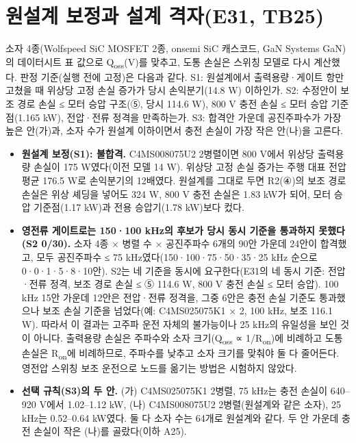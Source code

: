 \section{원설계 보정과 설계 격자(E31, TB25)}

소자 4종(Wolfspeed SiC MOSFET 2종, onsemi SiC 캐스코드, GaN Systems GaN)의 데이터시트 표 값으로 Q\textsubscript{oss}(V)를 맞추고\cite{b34}, 도통 손실은 스위칭 모델로 다시 계산했다. 판정 기준(실행 전에 고정)은 다음과 같다. S1: 원설계에서 출력용량·게이트 항만 고쳤을 때 위상당 고정 손실 증가가 당시 손익분기(14.8 W) 이하인가. S2: 수정안이 보조 경로 손실 ≤ 모터 승압 구조(⑤, 당시 114.6 W), 800 V 충전 손실 ≤ 모터 승압 기준점(1.165 kW), 전압·전류 정격을 만족하는가. S3: 합격안 가운데 공진주파수가 가장 높은 안(가)과, 소자 수가 원설계 이하이면서 충전 손실이 가장 작은 안(나)을 고른다.

\begin{itemize}
\item \textbf{원설계 보정(S1): 불합격.} C4MS008075U2 2병렬이면 800 V에서 위상당 출력용량 손실이 175 W였다(이전 모델 14 W). 위상당 고정 손실 증가는 주행 대표 전압 평균 176.5 W로 손익분기의 12배였다. 원설계를 그대로 두면 R2(④)의 보조 경로 손실은 위상 셰딩을 넣어도 324 W, 800 V 충전 손실은 1.83 kW가 되어, 모터 승압 기준점(1.17 kW)과 전용 승압기(1.78 kW)보다 컸다.
\item \textbf{영전류 게이트로는 150·100 kHz의 후보가 당시 동시 기준을 통과하지 못했다(S2 0/30).} 소자 4종 × 병렬 수 × 공진주파수 6개의 90안 가운데 24안이 합격했고, 모두 공진주파수 ≤ 75 kHz였다(150·100·75·50·35·25 kHz 순으로 0·0·1·5·8·10안). S2는 네 기준을 동시에 요구한다(E31의 네 동시 기준: 전압·전류 정격, 보조 경로 손실 ≤ ⑤ 114.6 W, 800 V 충전 손실 ≤ 모터 승압). 100 kHz 15안 가운데 12안은 전압·전류 정격을, 그중 6안은 충전 손실 기준도 통과했으나 보조 손실 기준을 넘었다(예: C4MS025075K1 × 2, 100 kHz, 보조 116.1 W). 따라서 이 결과는 고주파 운전 자체의 불가능이나 25 kHz의 유일성을 보인 것이 아니다. 출력용량 손실은 주파수와 소자 크기(Q\textsubscript{oss} ∝ 1/R\textsubscript{on})에 비례하고 도통 손실은 R\textsubscript{on}에 비례하므로, 주파수를 낮추고 소자 크기를 맞춰야 둘 다 줄어든다. 영전압 스위칭 보조 운전으로 노드를 옮기는 방법은 시험하지 않았다.
\item \textbf{선택 규칙(S3)의 두 안.} (가) C4MS025075K1 2병렬, 75 kHz는 충전 손실이 640–920 V에서 1.02–1.12 kW, (나) C4MS008075U2 2병렬(원설계와 같은 소자), 25 kHz는 0.52–0.64 kW였다. 둘 다 소자 수는 64개로 원설계와 같다. 두 안 가운데 충전 손실이 작은 (나)를 골랐다(이하 A25).
\end{itemize}

